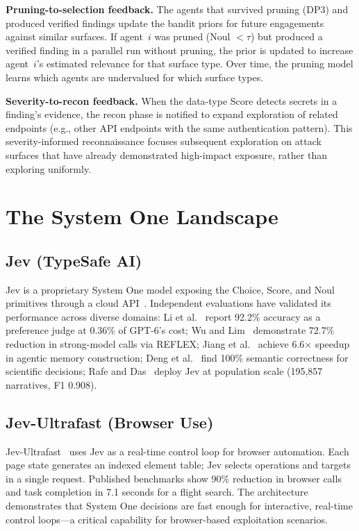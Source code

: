 \documentclass[conference]{IEEEtran}
\begin{document}
\textbf{Pruning-to-selection feedback.} The agents that survived pruning (DP3) and produced verified findings update the bandit priors for future engagements against similar surfaces. If agent~$i$ was pruned (Noul $< \tau$) but produced a verified finding in a parallel run without pruning, the prior is updated to increase agent~$i$'s estimated relevance for that surface type. Over time, the pruning model learns which agents are undervalued for which surface types.

\textbf{Severity-to-recon feedback.} When the data-type Score detects secrets in a finding's evidence, the recon phase is notified to expand exploration of related endpoints (e.g., other API endpoints with the same authentication pattern). This severity-informed reconnaissance focuses subsequent exploration on attack surfaces that have already demonstrated high-impact exposure, rather than exploring uniformly.

\section{The System One Landscape}\label{sec:landscape}

\subsection{Jev (TypeSafe AI)}

Jev is a proprietary System One model exposing the Choice, Score, and Noul primitives through a cloud API~\cite{typesafe2026docs}. Independent evaluations have validated its performance across diverse domains: Li et al.~\cite{li2026jevasjudge} report 92.2\% accuracy as a preference judge at 0.36\% of GPT-6's cost; Wu and Lim~\cite{wu2026reflex} demonstrate 72.7\% reduction in strong-model calls via REFLEX; Jiang et al.~\cite{jiang2026jevmem} achieve 6.6$\times$ speedup in agentic memory construction; Deng et al.~\cite{deng2026jevscience} find 100\% semantic correctness for scientific decisions; Rafe and Das~\cite{rafe2026crash} deploy Jev at population scale (195,857 narratives, F1 0.908).

\subsection{Jev-Ultrafast (Browser Use)}

Jev-Ultrafast~\cite{browseruse2026} uses Jev as a real-time control loop for browser automation. Each page state generates an indexed element table; Jev selects operations and targets in a single request. Published benchmarks show 90\% reduction in browser calls and task completion in 7.1 seconds for a flight search. The architecture demonstrates that System One decisions are fast enough for interactive, real-time control loops---a critical capability for browser-based exploitation scenarios.
\end{document}
